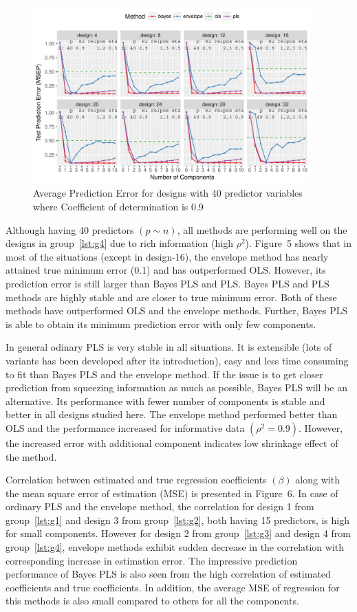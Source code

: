 \documentclass[num-refs]{wiley-article}
\begin{document}
\begin{figure}[!hptb]
\centering
\includegraphics[width = 0.95\textwidth]{prediction-error-40-2.pdf}
\caption[Prediction Error - 4]{Average Prediction Error for designs with 40 predictor
variables where Coefficient of determination is 0.9}
\label{fig:pred-error-40-2}
\end{figure}

Although having 40 predictors $(p\sim n)$, all methods are performing well on the designs in group~\ref{lst:g4} due to rich information (high $\rho^2$). Figure~5 shows that in most of the situations (except in design-16), the envelope method has nearly attained true minimum error (0.1) and has outperformed OLS. However, its prediction error is still larger than Bayes PLS and PLS. Bayes PLS and PLS methods are highly stable and are closer to true minimum error. Both of these methods have outperformed OLS and the envelope methods. Further, Bayes PLS is able to obtain its minimum prediction error with only few components.

In general odinary PLS is very stable in all situations. It is extensible (lots of variants has been developed after its introduction), easy and less time consuming to fit than Bayes PLS and the envelope method. If the issue is to get closer prediction from squeezing information as much as possible, Bayes PLS will be an alternative. Its performance with fewer number of components is stable and better in all designs studied here. The envelope method performed better than OLS and the performance increased for informative data $(\rho^2 = 0.9)$. However, the increased error with additional component indicates low shrinkage effect of the
method.

Correlation between estimated and true regression coefficients $(\beta)$ along with the mean square error of estimation (MSE) is presented in Figure~6. In case of ordinary PLS and the envelope method, the correlation for design 1 from group~\ref{lst:g1} and design 3 from group~\ref{lst:g2}, both having 15 predictors, is high for small components. However for design 2 from group~\ref{lst:g3} and design 4 from group~\ref{lst:g4}, envelope methods exhibit sudden decrease in the correlation with corresponding increase in estimation error. The impressive prediction performance of Bayes PLS is also seen from the high correlation of estimated coefficients and true coefficients. In addition, the average MSE of regression for this methods is also small compared to others for all the components.
\end{document}
